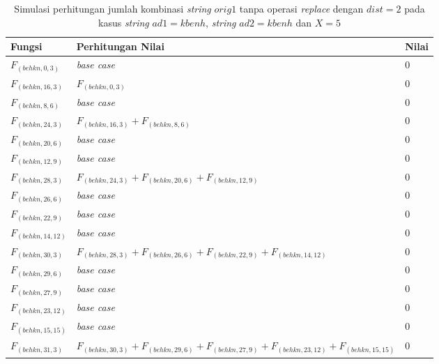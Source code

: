 \begin{appendices}
  
  \begin{table}[H]
  	\centering
  	\begin{tabular} {|p{3cm}|p{5cm}|p{1cm}|} \hline
  		Fungsi & Perhitungan Nilai & Nilai \\ \hline
  		$ F_{(behkn, 0, 3)} $ & \textit{base case} & $ 0 $ \\ \hline
  		$ F_{(behkn, 16, 3)}  $ & $F_{(behkn, 0, 3)}$ & $ 0 $ \\ \hline
  		$ F_{(behkn, 8, 6)} $ & \textit{base case} & $ 0 $ \\ \hline
  		$ F_{(behkn, 24, 3)}  $ & $F_{(behkn, 16, 3)} + F_{(behkn, 8, 6)}$ & $ 0 $ \\ \hline
  		$ F_{(behkn, 20, 6)} $ & \textit{base case} & $ 0 $ \\ \hline
  		$ F_{(behkn, 12, 9)} $ & \textit{base case} & $ 0 $ \\ \hline
  		$ F_{(behkn, 28, 3)}  $ & $F_{(behkn, 24, 3)} + F_{(behkn, 20, 6)} + F_{(behkn, 12, 9)}$ & $ 0 $ \\ \hline
  		$ F_{(behkn, 26, 6)} $ & \textit{base case} & $ 0 $ \\ \hline
  		$ F_{(behkn, 22, 9)} $ & \textit{base case} & $ 0 $ \\ \hline
  		$ F_{(behkn, 14, 12)} $ & \textit{base case} & $ 0 $ \\ \hline
  		$ F_{(behkn, 30, 3)}  $ & $F_{(behkn, 28, 3)} + F_{(behkn, 26, 6)} + F_{(behkn, 22, 9)} + F_{(behkn, 14, 12)}$ & $ 0 $ \\ \hline
  		$ F_{(behkn, 29, 6)} $ & \textit{base case} & $ 0 $ \\ \hline
  		$ F_{(behkn, 27, 9)} $ & \textit{base case} & $ 0 $ \\ \hline
  		$ F_{(behkn, 23, 12)} $ & \textit{base case} & $ 0 $ \\ \hline
  		$ F_{(behkn, 15, 15)} $ & \textit{base case} & $ 0 $ \\ \hline
  		\rowcolor{LightCyan}
  		$ F_{(behkn, 31, 3)}  $ & $F_{(behkn, 30, 3)} + F_{(behkn, 29, 6)} + F_{(behkn, 27, 9)} + F_{(behkn, 23, 12)} + F_{(behkn, 15, 15)}$ & $ 0 $ \\ \hline
  	\end{tabular}\caption{Simulasi perhitungan jumlah kombinasi \textit{string} $ orig1 $ tanpa operasi \textit{replace} dengan $ dist= 2  $ pada kasus \textit{string} $ ad1=kbenh $, \textit{string} $ ad2=kbenh $ dan $ X=5 $}
  	\label{tab:f_3_orig1_2_1}
  \end{table}
  

\end{appendices}
